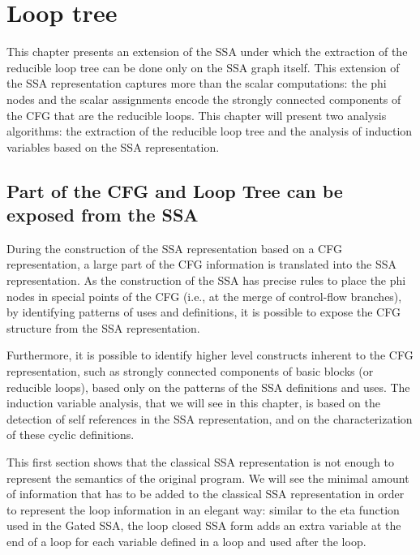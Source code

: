 \chapter{Loop tree }
\graphicspath{{fig/}{loop_tree/fig/}{part3/loop_tree/fig/}}


\providecommand{\SSA}{SSA}
\providecommand{\CFG}{CFG}
\providecommand{\loopphi}{loop-$\phi$}
\providecommand{\closephi}{close-$\phi$}
\providecommand{\CHREC}[1]{\{#1\}}

This chapter presents an extension of the \SSA{} under which the
extraction of the reducible loop tree can be done only on the \SSA{}
graph itself.  This extension of the \SSA{} representation captures
more than the scalar computations: the phi nodes and the scalar
assignments encode the strongly connected components of the CFG that
are the reducible loops.  This chapter will present two analysis
algorithms: the extraction of the reducible loop tree and the analysis
of induction variables based on the \SSA{} representation.

\section{Part of the \CFG{} and Loop Tree can be exposed from the \SSA{}}

During the construction of the \SSA{} representation based on a \CFG{}
representation, a large part of the \CFG{} information is translated
into the \SSA{} representation.  As the construction of the \SSA{} has
precise rules to place the phi nodes in special points of the \CFG{}
(i.e., at the merge of control-flow branches), by identifying patterns
of uses and definitions, it is possible to expose the \CFG{} structure
from the \SSA{} representation.

Furthermore, it is possible to identify higher level constructs
inherent to the \CFG{} representation, such as strongly connected
components of basic blocks (or reducible loops), based only on the
patterns of the \SSA{} definitions and uses.  The induction variable
analysis, that we will see in this chapter, is based on the detection
of self references in the \SSA{} representation, and on the
characterization of these cyclic definitions.

This first section shows that the classical \SSA{} representation is
not enough to represent the semantics of the original program.  We
will see the minimal amount of information that has to be added to the
classical \SSA{} representation in order to represent the loop
information in an elegant way: similar to the eta function used in the
Gated \SSA{}, the loop closed \SSA{} form adds an extra variable at
the end of a loop for each variable defined in a loop and used after
the loop.

